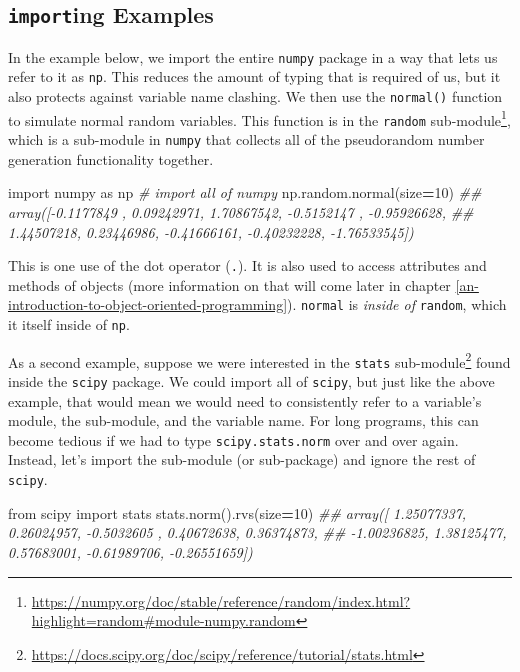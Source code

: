 \documentclass[
  12pt,
  krantz2]{krantz}
\makeatletter
\newenvironment{Shaded}{\begin{snugshade}}{\end{snugshade}}
\newcommand{\CommentTok}[1]{\textcolor[rgb]{0.37,0.37,0.37}{\textit{#1}}}
\newcommand{\DecValTok}[1]{\textcolor[rgb]{0.06,0.06,0.06}{#1}}
\newcommand{\ImportTok}[1]{#1}
\newcommand{\NormalTok}[1]{#1}
\newcommand{\OperatorTok}[1]{\textcolor[rgb]{0.43,0.43,0.43}{\textbf{#1}}}
\renewcommand{\href}[2]{#2\footnote{\url{#1}}}
\newenvironment{kframe}{%
\medskip{}
\setlength{\fboxsep}{.8em}
 \def\at@end@of@kframe{}%
 \ifinner\ifhmode%
  \def\at@end@of@kframe{\end{minipage}}%
  \begin{minipage}{\columnwidth}%
 \fi\fi%
 \def\FrameCommand##1{\hskip\@totalleftmargin \hskip-\fboxsep
 \colorbox{shadecolor}{##1}\hskip-\fboxsep
     \hskip-\linewidth \hskip-\@totalleftmargin \hskip\columnwidth}%
 \MakeFramed {\advance\hsize-\width
   \@totalleftmargin\z@ \linewidth\hsize
   \@setminipage}}%
 {\par\unskip\endMakeFramed%
 \at@end@of@kframe}
\renewenvironment{Shaded}{\begin{kframe}}{\end{kframe}}
\makeatother
\begin{document}
\hypertarget{importing-examples}{%
\subsection{\texorpdfstring{\texttt{import}ing Examples}{importing Examples}}\label{importing-examples}}

In the example below, we import the entire \texttt{numpy} package in a way that lets us refer to it as \texttt{np}. This reduces the amount of typing that is required of us, but it also protects against variable name clashing. We then use the \texttt{normal()} function to simulate normal random variables. This function is in the \href{https://numpy.org/doc/stable/reference/random/index.html?highlight=random\#module-numpy.random}{\texttt{random} sub-module}, which is a sub-module in \texttt{numpy} that collects all of the pseudorandom number generation functionality together.

\begin{Shaded}
\begin{Highlighting}[]
\ImportTok{import}\NormalTok{ numpy }\ImportTok{as}\NormalTok{ np }\CommentTok{\# import all of numpy}
\NormalTok{np.random.normal(size}\OperatorTok{=}\DecValTok{10}\NormalTok{)}
\CommentTok{\#\# array([{-}0.1177849 ,  0.09242971,  1.70867542, {-}0.5152147 , {-}0.95926628,}
\CommentTok{\#\#         1.44507218,  0.23446986, {-}0.41666161, {-}0.40232228, {-}1.76533545])}
\end{Highlighting}
\end{Shaded}

This is one use of the dot operator (\texttt{.}). It is also used to access attributes and methods of objects (more information on that will come later in chapter \ref{an-introduction-to-object-oriented-programming}). \texttt{normal} is \emph{inside of} \texttt{random}, which it itself inside of \texttt{np}.

As a second example, suppose we were interested in the \href{https://docs.scipy.org/doc/scipy/reference/tutorial/stats.html}{\texttt{stats} sub-module} found inside the \texttt{scipy} package. We could import all of \texttt{scipy}, but just like the above example, that would mean we would need to consistently refer to a variable's module, the sub-module, and the variable name. For long programs, this can become tedious if we had to type \texttt{scipy.stats.norm} over and over again. Instead, let's import the sub-module (or sub-package) and ignore the rest of \texttt{scipy}.

\begin{Shaded}
\begin{Highlighting}[]
\ImportTok{from}\NormalTok{ scipy }\ImportTok{import}\NormalTok{ stats}
\NormalTok{stats.norm().rvs(size}\OperatorTok{=}\DecValTok{10}\NormalTok{)}
\CommentTok{\#\# array([ 1.25077337,  0.26024957, {-}0.5032605 ,  0.40672638,  0.36374873,}
\CommentTok{\#\#        {-}1.00236825,  1.38125477,  0.57683001, {-}0.61989706, {-}0.26551659])}
\end{Highlighting}
\end{Shaded}
\end{document}
